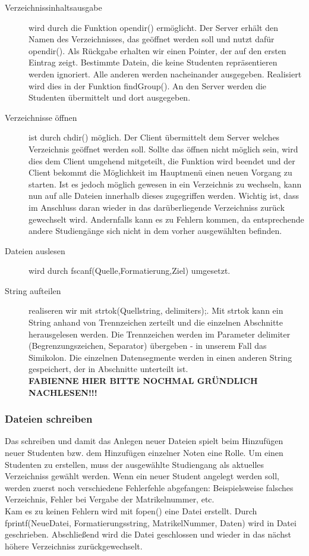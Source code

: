 \documentclass{scrartcl}
\begin{document}
			\begin{description}
				\item[Verzeichnissinhaltsausgabe] wird durch die Funktion opendir() ermöglicht. Der Server erhält den Namen des Verzeichnisses, das geöffnet werden soll und nutzt dafür opendir(). Als Rückgabe erhalten wir einen Pointer, der auf den ersten Eintrag zeigt. Bestimmte Datein, die keine Studenten repräsentieren werden ignoriert. Alle anderen werden nacheinander ausgegeben. Realisiert wird dies in der Funktion findGroup(). An den Server werden die Studenten übermittelt und dort ausgegeben.
				\item[Verzeichnisse öffnen] ist durch chdir() möglich. Der Client übermittelt dem Server welches Verzeichnis geöffnet werden soll. Sollte das öffnen nicht möglich sein, wird dies dem Client umgehend mitgeteilt, die Funktion wird beendet und der Client bekommt die Möglichkeit im Hauptmenü einen neuen Vorgang zu starten. Ist es jedoch möglich gewesen in ein Verzeichnis zu wechseln, kann nun auf alle Dateien innerhalb dieses zugegriffen werden. Wichtig ist, dass im Anschluss daran wieder in das darüberliegende Verzeichniss zurück gewechselt wird. Andernfalls kann es zu Fehlern kommen, da entsprechende andere Studiengänge sich nicht in dem vorher ausgewählten befinden.
				\item[Dateien auslesen] wird durch fscanf(Quelle,Formatierung,Ziel) umgesetzt.
				\item[String aufteilen] realiseren wir mit  strtok(Quellstring, delimiters);. Mit strtok kann ein String anhand von Trennzeichen zerteilt und die einzelnen Abschnitte herausgelesen werden. Die Trennzeichen werden im Parameter delimiter (Begrenzungszeichen, Separator) übergeben - in unserem Fall das Simikolon. Die einzelnen Datensegmente werden in einen anderen String gespeichert, der in Abschnitte unterteilt ist. \\
				\textbf{FABIENNE HIER BITTE NOCHMAL GRÜNDLICH NACHLESEN!!!}
			\end{description}
		\subsubsection{Dateien schreiben}	
			Das schreiben und damit das Anlegen neuer Dateien spielt beim Hinzufügen neuer Studenten bzw. dem Hinzufügen einzelner Noten eine Rolle. Um einen Studenten zu erstellen, muss der ausgewählte Studiengang als aktuelles Verzeichniss gewählt werden. Wenn ein neuer Student angelegt werden soll, werden zuerst noch verschiedene Fehlerfehle abgefangen: Beispielsweise falsches Verzeichnis, Fehler bei Vergabe der Matrikelnummer, etc. \\
			Kam es zu keinen Fehlern wird mit fopen() eine Datei erstellt. Durch fprintf(NeueDatei, Formatierungsstring, MatrikelNummer, Daten) wird in Datei geschrieben. Abschließend wird die Datei geschlossen und wieder in das nächst höhere Verzeichniss zurückgewechselt.
\end{document}
